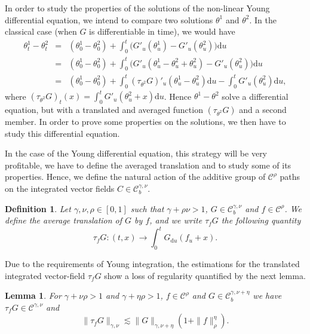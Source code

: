 \documentclass[a4paper,11pt]{article}
\newcommand{\mathd}{\mathrm{d}}
\newtheorem{definition}[theorem]{Definition}
\newtheorem{lemma}[theorem]{Lemma}
\newcommand{\CC}{\mathscr C}
\begin{document}
In order to study the properties of the solutions of the non-linear Young
differential equation, we intend to compare two solutions $\theta^{1}$ and
$\theta^{2}$. In the classical case (when $G$ is differentiable in time), we
would have
\begin{eqnarray*}
  \theta^{1}_{t} - \theta^{2}_{t} & = & ( \theta^{1}_{0} - \theta^{2}_{0} ) +
  \int_{0}^{t}\big( G'_{u} ( \theta^{1}_{u} ) -G'_{u} ( \theta^{2}_{u} )\big) \mathd u\\
  & = & ( \theta^{1}_{0} - \theta^{2}_{0} ) + \int_{0}^{t} \big( G'_{u} (
  \theta^{1}_{u} - \theta^{2}_{u} + \theta^{2}_{u} ) -G'_{u} ( \theta^{2}_{u}
  )\big) \mathd u\\
  & = & ( \theta^{1}_{0} - \theta^{2}_{0} ) + \int_{0}^{t} (
  \tau_{\theta^{2}} G )'_{u} ( \theta^{1}_{u} - \theta^{2}_{u} ) \mathd u-
  \int_{0}^{t} G'_{u} ( \theta^{2}_{u} ) \mathd u,
\end{eqnarray*}
where $( \tau_{\theta^{2}} G )_{t} ( x ) = \int_{0}^{t} G'_{u} (
\theta^{2}_{u} +x ) \mathd u$. Hence $\theta^{1} - \theta^{2}$ solve a
differential equation, but with a translated and averaged function $(
\tau_{\theta^{2}} G )$ and a second member. In order to prove some properties
on the solutions, we then have to study this differential equation.

In the case of the Young differential equation, this strategy will be very
profitable, we have to define the averaged translation and to study some
of its properties. Hence, we define the natural action of the additive group
of $\CC^{\rho}$ paths on the integrated vector fields $C \in \CC^{\gamma ,
\nu}_{b}$.

\begin{definition}
  Let $\gamma , \nu , \rho \in [ 0,1 ]$ such that $\gamma + \rho \nu >1$, $G
  \in \CC_{b}^{\gamma , \nu}$ and $f \in \CC^{\rho}$. We define the average
  translation of $G$ by $f$, and we write $\tau_{f} G$ the following quantity
  \[ \tau_{f} G: ( t,x ) \rightarrow \int_{0}^{t} G_{\mathd u} ( f_{u} +x ) .
  \]
\end{definition}

Due to the requirements of Young integration, the estimations for the
translated integrated vector-field $\tau_{f} G$ show a loss of regularity
quantified by the next lemma.

\begin{lemma}
  \label{lemma:translation}For $\gamma + \nu \rho >1$ and $\gamma + \eta \rho
  >1$, $f \in \CC^{\rho}$ and $G \in \CC_{b}^{\gamma , \nu + \eta}$ we have
  $\tau_{f} G \in \CC^{\gamma , \nu}$ and
  \[ \| \tau_{f} G \|_{\gamma , \nu} \lesssim \| G \|_{\gamma , \nu + \eta} (
     1+ \| f \|^{\eta}_{\rho} ) .\]
\end{lemma}
\end{document}
